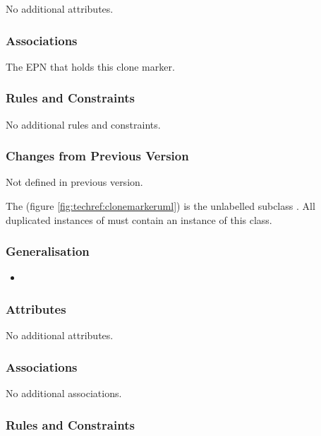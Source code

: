 No additional attributes.

\subsubsection{Associations}

\begin{attributes}
 The EPN that holds this
clone marker.
\end{attributes}

\subsubsection{Rules and Constraints}

No additional rules and constraints.

\subsubsection{Changes from Previous Version}

Not defined in previous version.


The  (figure \ref{fig:techref:clonemarkeruml}) is
the unlabelled subclass . All duplicated
instances of  must contain an instance of this
class.

\subsubsection{Generalisation}

\begin{itemize}
\item {}
\end{itemize}

\subsubsection{Attributes}

No additional attributes.

\subsubsection{Associations}

No additional associations.

\subsubsection{Rules and Constraints}

